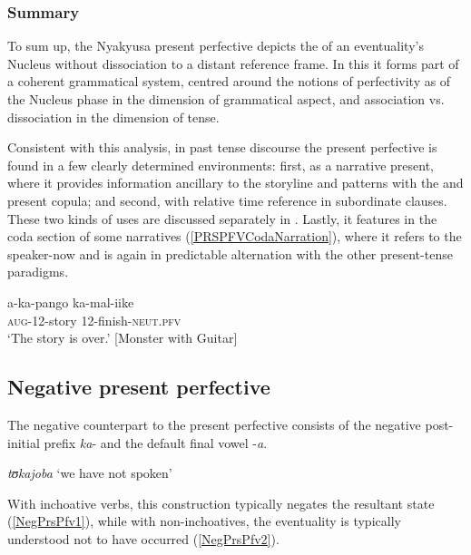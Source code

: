 \subsubsection{Summary}
To sum up, the Nyakyusa present perfective depicts the  of an eventuality's Nucleus without dissociation to a distant reference frame. In this it forms part of a coherent grammatical system, centred around the notions of perfectivity as  of the Nucleus phase in the dimension of grammatical aspect, and association vs. dissociation in the dimension of tense.

Consistent with this analysis, in past tense  discourse the present perfective is found in a few clearly determined environments: first, as a narrative present, where it provides information ancillary to the storyline and patterns with the  and present copula; and second, with relative time reference in subordinate clauses. These two kinds of uses are discussed separately in . Lastly, it features in the coda section of some narratives (\ref{PRSPFVCodaNarration}), where it refers to the speaker-now and is again in predictable alternation with the other present-tense paradigms.

\begin{exe}
\ex \label{PRSPFVCodaNarration} \gll a-ka-pango ka-mal-iike\\
\textsc{aug}-12-story 12-finish-\textsc{neut}.\textsc{pfv}\\
\glt \lq The story is over.' [Monster with Guitar]
\end{exe}

\subsection{Negative present perfective}\label{NEGPresentPerfective}
The negative counterpart to the present perfective consists of the negative post-initial prefix \textit{ka}- and the default final vowel -\textit{a}.

\begin{exe}
\ex \textit{tʊkajoba} \lq we have not spoken'
\end{exe}
With inchoative verbs, this construction typically negates the resultant state (\ref{NegPrsPfv1}), while with non-inchoatives, the eventuality is typically understood not to have occurred (\ref{NegPrsPfv2}).

